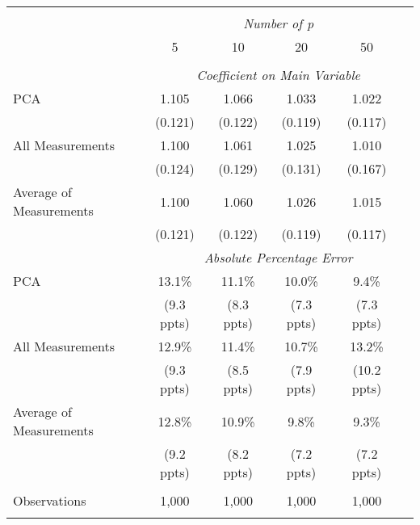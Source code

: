 \begin{table}[!htbp] \centering
\begin{tabular}{@{\extracolsep{5pt}}lccccc}
\\[-1.8ex]\hline
\hline \\[-1.8ex]
& \multicolumn{5}{c}{\textit{Number of p}} \
\cr \cline{5-6}
\\[-1.8ex] & 5 & 10 & 20 & 50 \\
\hline \\[-1.8ex]
& \multicolumn{5}{c}{\textit{Coefficient on Main Variable}} \\
 PCA & 1.105 & 1.066 & 1.033 & 1.022  \\
  & (0.121) & (0.122) & (0.119) & (0.117)\\
 All Measurements & 1.100 & 1.061 & 1.025 & 1.010  \\
  & (0.124) & (0.129) & (0.131) & (0.167)\\
 Average of Measurements & 1.100 & 1.060 & 1.026 & 1.015  \\
  & (0.121) & (0.122) & (0.119) & (0.117)\\
& \multicolumn{5}{c}{\textit{Absolute Percentage Error}} \\
  PCA & 13.1\% & 11.1\% & 10.0\% & 9.4\%  \\
   & (9.3 ppts) & (8.3 ppts) & (7.3 ppts) & (7.3 ppts)\\
  All Measurements & 12.9\% & 11.4\% & 10.7\% & 13.2\%  \\
  & (9.3 ppts) & (8.5 ppts) & (7.9 ppts) & (10.2 ppts)\\
  Average of Measurements & 12.8\% & 10.9\% & 9.8\% & 9.3\%  \\
  & (9.2 ppts) & (8.2 ppts) & (7.2 ppts) & (7.2 ppts)\\
\hline \\[-1.8ex]
 Observations & 1,000 & 1,000 & 1,000 & 1,000 & \\
\hline
\hline \\[-1.8ex]
\end{tabular}
\end{table}